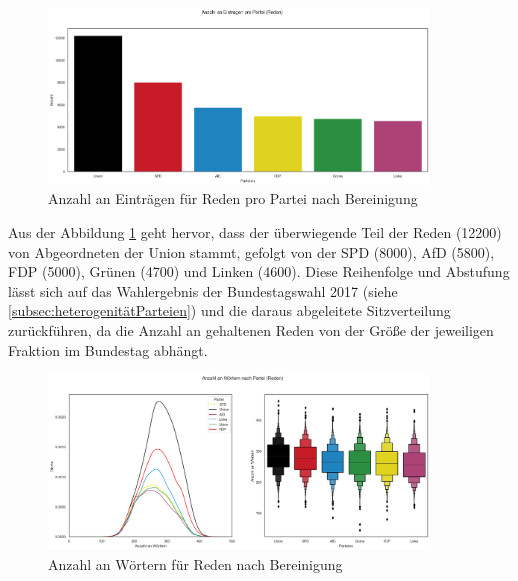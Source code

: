 \begin{figure}[H]
    \centering
    \includegraphics[width=0.9\textwidth]{data/images/speeches/speeches_num_samples_after_filter.png}
    \caption{Anzahl an Einträgen für Reden pro Partei nach Bereinigung} \label{fig:speechesNumSamplesAfterFiltering}
\end{figure}

Aus der Abbildung \ref{fig:speechesNumSamplesAfterFiltering} geht hervor, dass der überwiegende Teil der Reden (\num{12200}) von Abgeordneten der Union stammt, gefolgt von der SPD (\num{8000}), AfD (\num{5800}), FDP (\num{5000}), Grünen (\num{4700}) und Linken (\num{4600}). Diese Reihenfolge und Abstufung lässt sich auf das Wahlergebnis der Bundestagswahl \num{2017} (siehe \autoref{subsec:heterogenitätParteien}) und die daraus abgeleitete Sitzverteilung zurückführen, da die Anzahl an gehaltenen Reden von der Größe der jeweiligen Fraktion im Bundestag abhängt.

\begin{figure}[H]
    \centering
    \includegraphics[width=0.9\textwidth]{data/images/speeches/speeches_word_count_after_filter.png}
    \caption{Anzahl an Wörtern für Reden nach Bereinigung} \label{fig:speechesWortCountAfterFiltering}
\end{figure}

